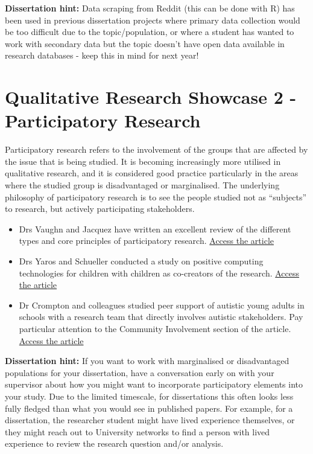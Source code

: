 \documentclass[
  english,
  letterpaper,
  DIV=11,
  numbers=noendperiod]{scrreprt}
\providecommand{\tightlist}{%
  \setlength{\itemsep}{0pt}\setlength{\parskip}{0pt}}
\begin{document}
\textbf{Dissertation hint:} Data scraping from Reddit (this can be done
with R) has been used in previous dissertation projects where primary
data collection would be too difficult due to the topic/population, or
where a student has wanted to work with secondary data but the topic
doesn't have open data available in research databases - keep this in
mind for next year!

\section{Qualitative Research Showcase 2 - Participatory
Research}\label{qualitative-research-showcase-2---participatory-research}

Participatory research refers to the involvement of the groups that are
affected by the issue that is being studied. It is becoming increasingly
more utilised in qualitative research, and it is considered good
practice particularly in the areas where the studied group is
disadvantaged or marginalised. The underlying philosophy of
participatory research is to see the people studied not as ``subjects''
to research, but actively participating stakeholders.

\begin{itemize}
\tightlist
\item
  Drs Vaughn and Jacquez have written an excellent review of the
  different types and core principles of participatory research.
  \href{https://jprm.scholasticahq.com/article/13244-participatory-research-methods-choice-points-in-the-research-process}{Access
  the article}
\item
  Drs Yaros and Schueller conducted a study on positive computing
  technologies for children with children as co-creators of the
  research. \href{https://www.jmir.org/2017/1/e14/}{Access the article}
\item
  Dr Crompton and colleagues studied peer support of autistic young
  adults in schools with a research team that directly involves autistic
  stakeholders. Pay particular attention to the Community Involvement
  section of the article.
  \href{https://journals.sagepub.com/doi/full/10.1177/13623613221081189}{Access
  the article}
\end{itemize}

\textbf{Dissertation hint:} If you want to work with marginalised or
disadvantaged populations for your dissertation, have a conversation
early on with your supervisor about how you might want to incorporate
participatory elements into your study. Due to the limited timescale,
for dissertations this often looks less fully fledged than what you
would see in published papers. For example, for a dissertation, the
researcher student might have lived experience themselves, or they might
reach out to University networks to find a person with lived experience
to review the research question and/or analysis.
\end{document}
